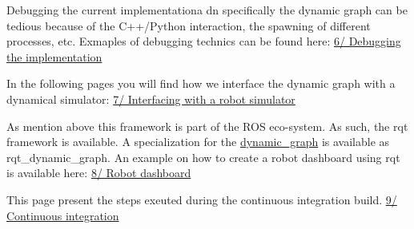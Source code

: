 Debugging the current implementationa dn specifically the dynamic graph can be tedious because of the C++/\+Python interaction, the spawning of different processes, etc. Exmaples of debugging technics can be found here\+: \hyperlink{subpage_debugging}{6/ Debugging the implementation}

In the following pages you will find how we interface the dynamic graph with a dynamical simulator\+: \hyperlink{subpage_robot_simulation}{7/ Interfacing with a robot simulator}

As mention above this framework is part of the R\+OS eco-\/system. As such, the rqt framework is available. A specialization for the \hyperlink{namespacedynamic__graph}{dynamic\+\_\+graph} is available as rqt\+\_\+dynamic\+\_\+graph. An example on how to create a robot dashboard using rqt is available here\+: \hyperlink{subpage_robot_dashboard}{8/ Robot dashboard}

This page present the steps exeuted during the continuous integration build. \hyperlink{subpage_ci}{9/ Continuous integration} 